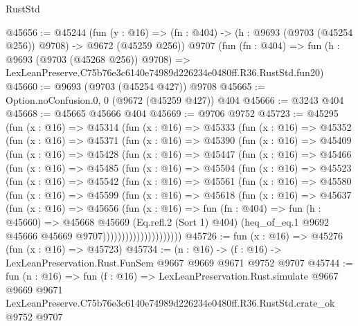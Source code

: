 \begin{lexlean}{RustStd}
\begin{coremodule}
@45656 := @45244
    (fun (y : @16) => (fn : @404) -> (h : @9693 (@9703 (@45254 @256)) @9708) -> @9672 (@45259 @256))
    @9707
    (fun (fn : @404) =>
    fun (h : @9693 (@9703 (@45268 @256)) @9708) =>
    LexLeanPreserve.C75b76e3c6140e74989d226234e0480ff.R36.RustStd.fun20)
@45660 := @9693 (@9703 (@45254 @427)) @9708
@45665 := Option.noConfusion.{0, 0} (@9672 (@45259 @427)) @404
@45666 := @3243 @404
@45668 := @45665 @45666 @404
@45669 := @9706 @9752
@45723 := @45295
    (fun (x : @16) =>
    @45314
      (fun (x : @16) =>
      @45333
        (fun (x : @16) =>
        @45352
          (fun (x : @16) =>
          @45371
            (fun (x : @16) =>
            @45390
              (fun (x : @16) =>
              @45409
                (fun (x : @16) =>
                @45428
                  (fun (x : @16) =>
                  @45447
                    (fun (x : @16) =>
                    @45466
                      (fun (x : @16) =>
                      @45485
                        (fun (x : @16) =>
                        @45504
                          (fun (x : @16) =>
                          @45523
                            (fun (x : @16) =>
                            @45542
                              (fun (x : @16) =>
                              @45561
                                (fun (x : @16) =>
                                @45580
                                  (fun (x : @16) =>
                                  @45599
                                    (fun (x : @16) =>
                                    @45618
                                      (fun (x : @16) =>
                                      @45637
                                        (fun (x : @16) =>
                                        @45656
                                          (fun (x : @16) =>
                                          fun (fn : @404) =>
                                          fun (h : @45660) =>
                                          @45668
                                            @45669
                                            (Eq.refl.{2} (Sort 1) @404)
                                            (heq_of_eq.{1}
                                              @9692
                                              @45666
                                              @45669
                                              @9707)))))))))))))))))))))
@45726 := fun (x : @16) => @45276 (fun (x : @16) => @45723)
@45734 := (n : @16) -> (f : @16) -> LexLeanPreservation.Rust.FunSem @9667 @9669 @9671 @9752 @9707
@45744 := fun (n : @16) =>
  fun (f : @16) =>
  LexLeanPreservation.Rust.simulate
    @9667
    @9669
    @9671
    LexLeanPreserve.C75b76e3c6140e74989d226234e0480ff.R36.RustStd.crate_ok
    @9752
    @9707
\end{coremodule}
\end{lexlean}
